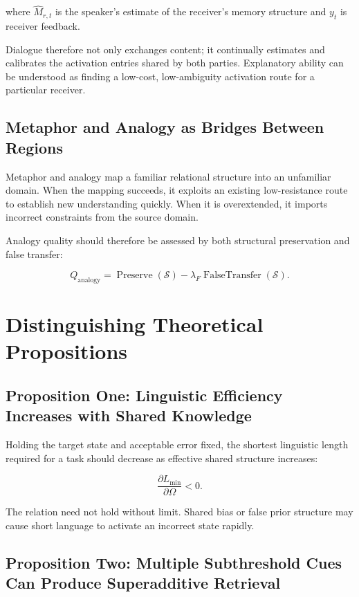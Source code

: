 \documentclass[11pt, a4paper]{article}
\begin{document}
where $\hat M_{r,t}$ is the speaker's estimate of the receiver's memory structure and $y_t$ is receiver feedback.


Dialogue therefore not only exchanges content; it continually estimates and calibrates the activation entries shared by both parties. Explanatory ability can be understood as finding a low-cost, low-ambiguity activation route for a particular receiver.


\subsection{Metaphor and Analogy as Bridges Between Regions}


Metaphor and analogy map a familiar relational structure into an unfamiliar domain. When the mapping succeeds, it exploits an existing low-resistance route to establish new understanding quickly. When it is overextended, it imports incorrect constraints from the source domain.


Analogy quality should therefore be assessed by both structural preservation and false transfer:


\[
Q_{\text{analogy}}
=
\operatorname{Preserve}(\mathcal{S})
-\lambda_F\operatorname{FalseTransfer}(\mathcal{S}).
\tag{18}
\]


\section{Distinguishing Theoretical Propositions}


\subsection{Proposition One: Linguistic Efficiency Increases with Shared Knowledge}


Holding the target state and acceptable error fixed, the shortest linguistic length required for a task should decrease as effective shared structure increases:


\[
\frac{\partial L_{\min}}{\partial \Omega}<0.
\tag{19}
\]

The relation need not hold without limit. Shared bias or false prior structure may cause short language to activate an incorrect state rapidly.


\subsection{Proposition Two: Multiple Subthreshold Cues Can Produce Superadditive Retrieval}
\end{document}
